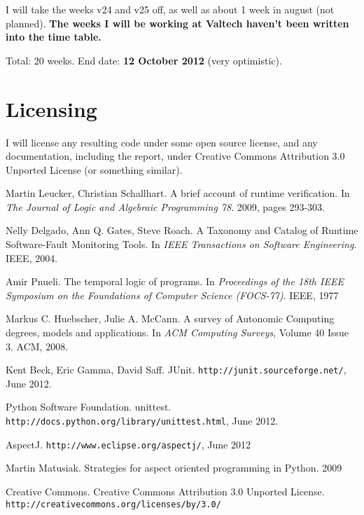 \documentclass[a4paper,11pt]{article}
\begin{document}
I will take the weeks v24 and v25 off, as well as about 1 week in august (not planned).
\textbf{The weeks I will be working at Valtech haven't been written into the time table.}

Total: 20 weeks. End date: \textbf{12 October 2012} (very optimistic).

\section{Licensing}

I will license any resulting code under some open source license, and any documentation, including the report, under Creative Commons Attribution 3.0 Unported License \cite{cc-by} (or something similar).


\begin{thebibliography}{9}

	Martin Leucker, Christian Schallhart.
	A brief account of runtime verification.
	In \emph{The Journal of Logic and Algebraic Programming 78}.
	2009, pages 293-303.

	Nelly Delgado, Ann Q. Gates, Steve Roach.
	A Taxonomy and Catalog of Runtime Software-Fault Monitoring Tools.
	In \emph{IEEE Transactions on Software Engineering}.
	IEEE, 2004.

	Amir Pnueli.
	The temporal logic of programs. 
	In \emph{Proceedings of the 18th IEEE Symposium on the Foundations of Computer Science (FOCS-77)}.
	IEEE, 1977

	Markus C. Huebscher, Julie A. McCann.
	A survey of Autonomic Computing \- degrees, models and applications.
	In \emph{ACM Computing Surveys}, Volume 40 Issue 3.
	ACM, 2008.
	
	Kent Beck, Eric Gamma, David Saff.
	JUnit.
	\texttt{http://junit.sourceforge.net/},
	June 2012.

	Python Software Foundation.
	unittest.
	\texttt{http://docs.python.org/library/unittest.html},
	June 2012.

	AspectJ.
	\texttt{http://www.eclipse.org/aspectj/},
	June 2012

	Martin Matusiak.
	Strategies for aspect oriented programming in Python.
	2009

	Creative Commons.
	Creative Commons Attribution 3.0 Unported License.
	\texttt{http://creativecommons.org/licenses/by/3.0/}

\end{thebibliography}
\end{document}
